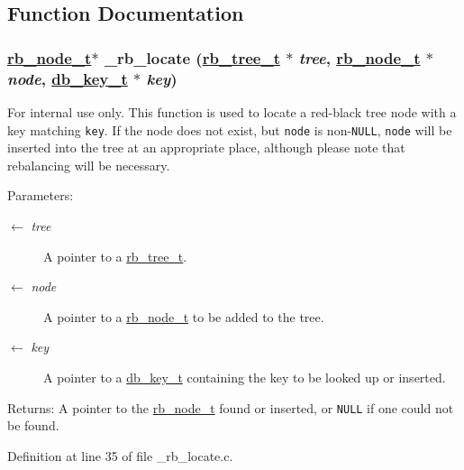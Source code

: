 \subsection{Function Documentation}
\hypertarget{group__dbprim__rbtree_ga15}{
\subsubsection[\_\-rb\_\-locate]{\setlength{\rightskip}{0pt plus 5cm}\hyperlink{struct__rb__node__s}{rb\_\-node\_\-t}$\ast$ \_\-rb\_\-locate (\hyperlink{struct__rb__tree__s}{rb\_\-tree\_\-t} $\ast$ {\em tree}, \hyperlink{struct__rb__node__s}{rb\_\-node\_\-t} $\ast$ {\em node}, \hyperlink{struct__db__key__s}{db\_\-key\_\-t} $\ast$ {\em key})}}
\label{group__dbprim__rbtree_ga15}


\begin{Desc}
\item[For internal use only.]
This function is used to locate a red-black tree node with a key matching {\tt key}. If the node does not exist, but {\tt node} is non-{\tt NULL}, {\tt node} will be inserted into the tree at an appropriate place, although please note that rebalancing will be necessary.

\begin{Desc}
\item[Parameters:]
\begin{description}
\item[\mbox{$\leftarrow$} {\em tree}]A pointer to a \hyperlink{group__dbprim__rbtree_ga0}{rb\_\-tree\_\-t}. \item[\mbox{$\leftarrow$} {\em node}]A pointer to a \hyperlink{group__dbprim__rbtree_ga1}{rb\_\-node\_\-t} to be added to the tree. \item[\mbox{$\leftarrow$} {\em key}]A pointer to a \hyperlink{group__dbprim_ga0}{db\_\-key\_\-t} containing the key to be looked up or inserted.\end{description}
\end{Desc}
\begin{Desc}
\item[Returns:]A pointer to the \hyperlink{group__dbprim__rbtree_ga1}{rb\_\-node\_\-t} found or inserted, or {\tt NULL} if one could not be found.\end{Desc}
\end{Desc}


Definition at line 35 of file \_\-rb\_\-locate.c.

